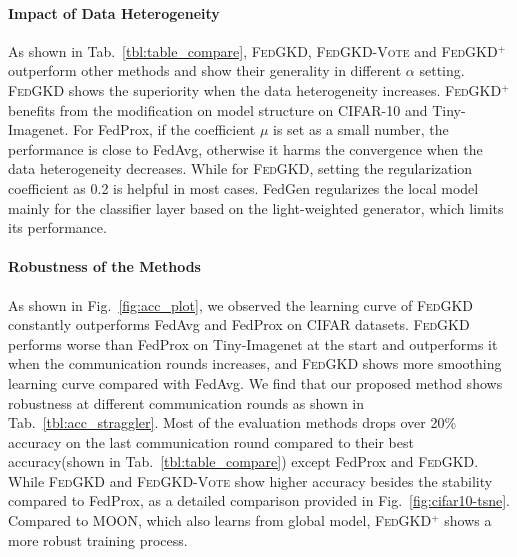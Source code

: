 \documentclass{article} %
\newcommand{\system}{\textsc{FedGKD}\xspace}
\newcommand{\systemled}{\textsc{FedGKD-Vote}\xspace}
\newcommand{\systemplus}{\textsc{FedGKD$^{+}$}\xspace}
\begin{document}
\paragraph{Impact of Data Heterogeneity}
As shown in Tab.~\ref{tbl:table_compare}, \system, \systemled and \systemplus outperform other methods and show their generality in different $\alpha$ setting. \system shows the superiority when the data heterogeneity increases. \systemplus benefits from the modification on model structure on CIFAR-10 and Tiny-Imagenet.
For FedProx, if the coefficient $\mu$ is set as a small number, the performance is close to FedAvg, otherwise it harms the convergence when the data heterogeneity decreases. While for \system, setting the regularization coefficient as 0.2 is helpful in most cases.
FedGen regularizes the local model mainly for the classifier layer based on the light-weighted generator, which limits its performance.

\paragraph{Robustness of the Methods}
As shown in Fig.~\ref{fig:acc_plot}, we observed the learning curve of \system constantly outperforms FedAvg and FedProx on CIFAR datasets. \system performs worse than FedProx on Tiny-Imagenet at the start and outperforms it when the communication rounds increases, and \system shows more smoothing learning curve compared with FedAvg.
We find that our proposed method shows robustness at different communication rounds as shown in Tab.~\ref{tbl:acc_straggler}. Most of the evaluation methods drops over 20\% accuracy on the last communication round compared to their best accuracy(shown in Tab.~\ref{tbl:table_compare}) except FedProx and \system.  While \system and \systemled show higher accuracy besides the stability compared to FedProx, as a detailed comparison provided in Fig.~\ref{fig:cifar10-tsne}. Compared to MOON, which also learns from global model, \systemplus shows a more robust training process.
\end{document}
